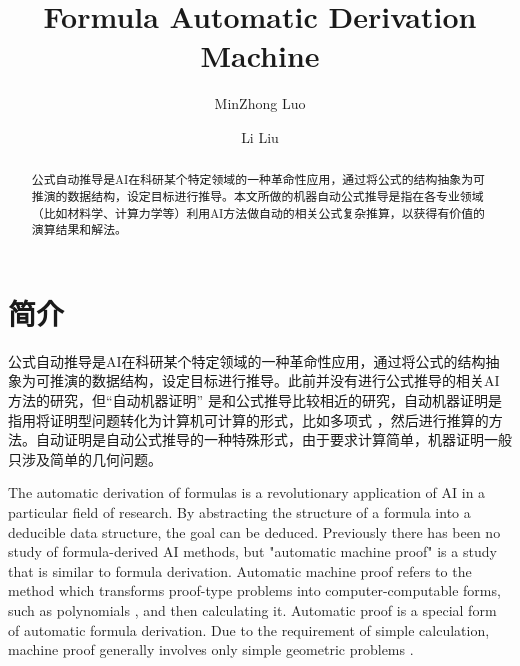 \documentclass[runningheads]{llncs}
\begin{document}
%
\title{Formula Automatic Derivation Machine}
%
%
\author{MinZhong Luo \and
Li Liu}
%
%
%
\maketitle              %
%
\begin{abstract}
公式自动推导是AI在科研某个特定领域的一种革命性应用，通过将公式的结构抽象为可推演的数据结构，设定目标进行推导。本文所做的机器自动公式推导是指在各专业领域（比如材料学、计算力学等）利用AI方法做自动的相关公式复杂推算，以获得有价值的演算结果和解法。

\end{abstract}
%
%
%
\section{简介}
公式自动推导是AI在科研某个特定领域的一种革命性应用，通过将公式的结构抽象为可推演的数据结构，设定目标进行推导。此前并没有进行公式推导的相关AI方法的研究，但“自动机器证明”\cite{ref_article1} 是和公式推导比较相近的研究，自动机器证明是指用将证明型问题转化为计算机可计算的形式，比如多项式 \cite{ref_article1}，然后进行推算的方法。自动证明是自动公式推导的一种特殊形式，由于要求计算简单，机器证明一般只涉及简单的几何问题\cite{ref_article1}。

The automatic derivation of formulas is a revolutionary application of AI in a particular field of research.  By abstracting the structure of a formula into a deducible data structure, the goal can be deduced. Previously there has been no study of formula-derived AI methods, but "automatic machine proof" \cite{ref_article1} is a study that is similar to formula derivation. Automatic machine proof refers to the method which transforms proof-type problems into computer-computable forms, such as polynomials \cite{ref_article1}, and then calculating it. Automatic proof is a special form of automatic formula derivation. Due to the requirement of simple calculation, machine proof generally involves only simple geometric problems \cite{ref_article1}.
\end{document}
